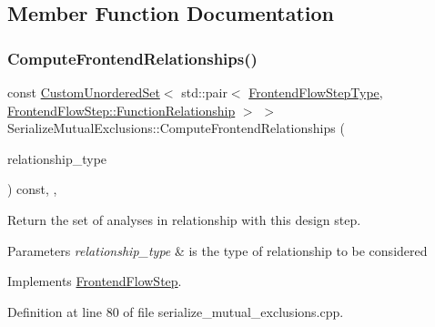 \subsection{Member Function Documentation}
\mbox{\label{classSerializeMutualExclusions_a254a59bffe9ecbe6b77f33934cf8dfbe}} 
\subsubsection{\texorpdfstring{Compute\+Frontend\+Relationships()}{ComputeFrontendRelationships()}}
{\footnotesize\ttfamily const \hyperlink{classCustomUnorderedSet}{Custom\+Unordered\+Set}$<$ std\+::pair$<$ \hyperlink{frontend__flow__step_8hpp_afeb3716c693d2b2e4ed3e6d04c3b63bb}{Frontend\+Flow\+Step\+Type}, \hyperlink{classFrontendFlowStep_af7cf30f2023e5b99e637dc2058289ab0}{Frontend\+Flow\+Step\+::\+Function\+Relationship} $>$ $>$ Serialize\+Mutual\+Exclusions\+::\+Compute\+Frontend\+Relationships (\begin{DoxyParamCaption}\item[{const \hyperlink{classDesignFlowStep_a723a3baf19ff2ceb77bc13e099d0b1b7}{Design\+Flow\+Step\+::\+Relationship\+Type}}]{relationship\+\_\+type }\end{DoxyParamCaption}) const\hspace{0.3cm}{\ttfamily [override]}, {\ttfamily [private]}, {\ttfamily [virtual]}}



Return the set of analyses in relationship with this design step. 


\begin{DoxyParams}{Parameters}
{\em relationship\+\_\+type} & is the type of relationship to be considered \\
\hline
\end{DoxyParams}


Implements \hyperlink{classFrontendFlowStep_abeaff70b59734e462d347ed343dd700d}{Frontend\+Flow\+Step}.



Definition at line 80 of file serialize\+\_\+mutual\+\_\+exclusions.\+cpp.



